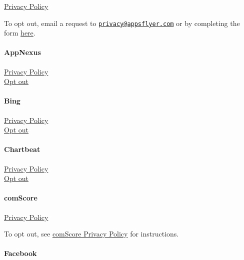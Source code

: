 \href{https://www.appsflyer.com/services-privacy-policy/}{Privacy
Policy}

To opt out, email a request to
\href{mailto:privacy@appsflyer.com}{\nolinkurl{privacy@appsflyer.com}}
or by completing the form \href{https://www.appsflyer.com/optout}{here}.

\hypertarget{appnexus}{%
\paragraph{AppNexus}\label{appnexus}}

\href{https://www.xandr.com/privacy/platform-privacy-policy/}{Privacy
Policy}\\
\href{https://www.appnexus.com/platform-privacy-policy\#choices}{Opt
out}

\hypertarget{bing}{%
\paragraph{Bing}\label{bing}}

\href{https://privacy.microsoft.com/en-us/privacystatement}{Privacy
Policy}\\
\href{https://about.ads.microsoft.com/en-us/resources/policies/opt-out-of-the-microsoft-advertising-optimization-program}{Opt
out}

\hypertarget{chartbeat}{%
\paragraph{Chartbeat}\label{chartbeat}}

\href{https://chartbeat.com/privacy/}{Privacy Policy}\\
\href{https://static.chartbeat.com/opt-out.html}{Opt out}

\hypertarget{comscore}{%
\paragraph{comScore}\label{comscore}}

\href{https://www.comscore.com/About/Privacy-Policy}{Privacy Policy}

To opt out, see
\href{https://www.comscore.com/About/Privacy-Policy}{comScore Privacy
Policy} for instructions.

\hypertarget{facebook}{%
\paragraph{Facebook}\label{facebook}}

